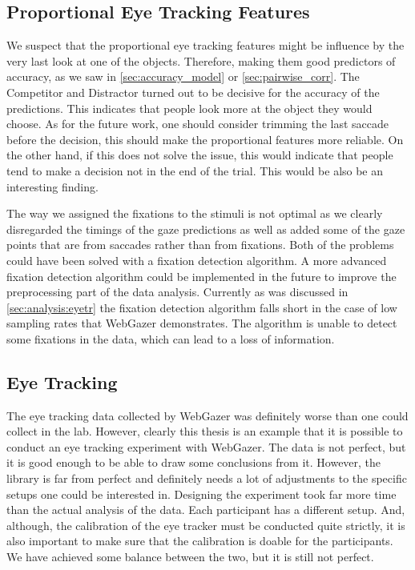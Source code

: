 \subsection{Proportional Eye Tracking Features}
\label{sec:general-discussion:proportional-eye-tracking-features}
We suspect that the proportional eye tracking features might be influence by the very last look at one of the objects. Therefore, making them good predictors of accuracy, as we saw in \autoref{sec:accuracy_model} or \autoref{sec:pairwise_corr}. The Competitor and Distractor turned out to be decisive for the accuracy of the predictions. This indicates that people look more at the object they would choose. As for the future work, one should consider trimming the last saccade before the decision, this should make the proportional features more reliable. On the other hand, if this does not solve the issue, this would indicate that people tend to make a decision not in the end of the trial. This would be also be an interesting finding.

The way we assigned the fixations to the stimuli is not optimal as we clearly disregarded the timings of the gaze predictions as well as added some of the gaze points that are from saccades rather than from fixations. Both of the problems could have been solved with a fixation detection algorithm. A more advanced fixation detection algorithm could be implemented in the future to improve the preprocessing part of the data analysis. Currently as was discussed in \autoref{sec:analysis:eyetr} the fixation detection algorithm falls short in the case of low sampling rates that WebGazer demonstrates. The algorithm is unable to detect some fixations in the data, which can lead to a loss of information.

\subsection{Eye Tracking}
\label{sec:general-discussion:eye-tracking}
The eye tracking data collected by WebGazer was definitely worse than one could collect in the lab. However, clearly this thesis is an example that it is possible to conduct an eye tracking experiment with WebGazer. The data is not perfect, but it is good enough to be able to draw some conclusions from it. However, the library is far from perfect and definitely needs a lot of adjustments to the specific setups one could be interested in. Designing the experiment took far more time than the actual analysis of the data. Each participant has a different setup. And, although, the calibration of the eye tracker must be conducted quite strictly, it is also important to make sure that the calibration is doable for the participants. We have achieved some balance between the two, but it is still not perfect. 

